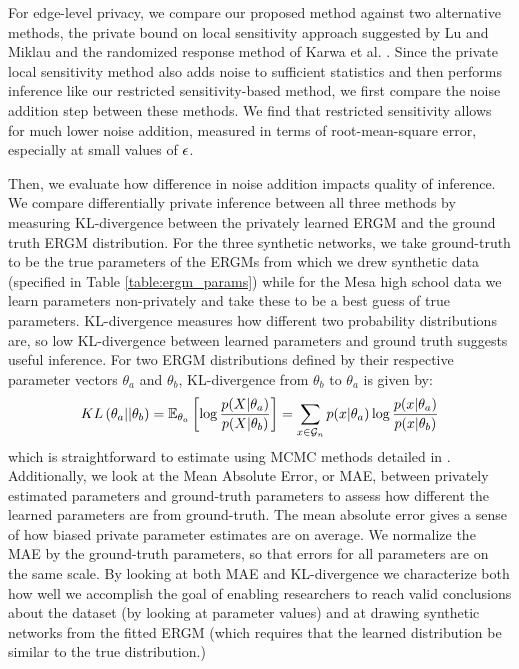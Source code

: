 For edge-level privacy, we compare our proposed method against two alternative methods, the private bound on local sensitivity approach suggested by Lu and Miklau \cite{LM14} and the randomized response method of Karwa et al. \cite{KKS17}. Since the private local sensitivity method also adds noise to sufficient statistics and then performs inference like our restricted sensitivity-based method, we first compare the noise addition step between these methods. We find that restricted sensitivity allows for much lower noise addition, measured in terms of root-mean-square error, especially at small values of $\epsilon$. 

Then, we evaluate how difference in noise addition impacts quality of inference. We compare differentially private inference between all three methods by measuring KL-divergence between the privately learned ERGM and the ground truth ERGM distribution. For the three synthetic networks, we take ground-truth to be the true parameters of the ERGMs from which we drew synthetic data (specified in Table \ref{table:ergm_params}) while for the Mesa high school data we learn parameters non-privately and take these to be a best guess of true parameters.  KL-divergence measures how different two probability distributions are, so low KL-divergence between learned parameters and ground truth suggests useful inference. For two ERGM distributions defined by their respective parameter vectors $\theta_a$ and $\theta_b$, KL-divergence from $\theta_b$ to $\theta_a$ is given by:
$$KL\left({\theta}_a || {\theta}_b\right) = \mathbb{E}_{{\theta}_a} \left[\log \frac{p(X | \theta_a)} {p(X | \theta_b) } \right] = \sum_{x \in \mathcal{G}_n} p(x | \theta_a) \log \frac{p(x | \theta_a)} {p(x | \theta_b)}$$
which is straightforward to estimate using MCMC methods detailed in \cite{HG10}. Additionally, we look at the Mean Absolute Error, or MAE, between privately estimated parameters and ground-truth parameters to assess how different the learned parameters are from ground-truth. The mean absolute error gives a sense of how biased private parameter estimates are on average. We normalize the MAE by the ground-truth parameters, so that errors for all parameters are on the same scale. By looking at both MAE and KL-divergence we characterize both how well we accomplish the goal of enabling researchers to reach valid conclusions about the dataset (by looking at parameter values) and at drawing synthetic networks from the fitted ERGM (which requires that the learned distribution be similar to the true distribution.)
 

